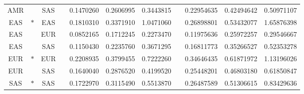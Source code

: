 \begin{table}[!htb]
\begin{tabular}{cccc*3{S[table-format=1.3]}c*3{S[table-format=1.3]}}
AMR &        & SAS   & &   0.1470260  &  0.2606995  &  0.3443815   & &   0.22954635  &  0.42494642  &  0.50971107 \\
EAS & $\ast$ & EAS   & &   0.1810310  &  0.3371910  &  1.0471060   & &   0.26898801  &  0.53432077  &  1.65876398 \\
EAS &        & EUR   & &   0.0852165  &  0.1712245  &  0.2273470   & &   0.11975636  &  0.25972257  &  0.29546667 \\
EAS &        & SAS   & &   0.1150430  &  0.2235760  &  0.3671295   & &   0.16811773  &  0.35266527  &  0.52353278 \\
EUR & $\ast$ & EUR   & &   0.2208935  &  0.3799455  &  0.7222260   & &   0.34646435  &  0.61871972  &  1.13196026 \\
EUR &        & SAS   & &   0.1640040  &  0.2876520  &  0.4199520   & &   0.25448201  &  0.46803180  &  0.61850847 \\
SAS & $\ast$ & SAS   & &   0.1722970  &  0.3115490  &  0.5513870   & &   0.26487589  &  0.51306615  &  0.83429636 \\
\bottomrule
\end{tabular}
\end{table}
